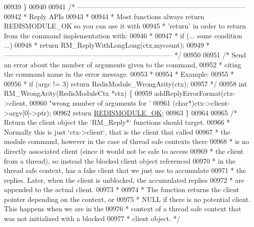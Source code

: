 \begin{DoxyCode}
{00939 \}
00940 
00941 \textcolor{comment}{/* --------------------------------------------------------------------------}
00942 \textcolor{comment}{ * Reply APIs}
00943 \textcolor{comment}{ *}
00944 \textcolor{comment}{ * Most functions always return REDISMODULE\_OK so you can use it with}
00945 \textcolor{comment}{ * 'return' in order to return from the command implementation with:}
00946 \textcolor{comment}{ *}
00947 \textcolor{comment}{ *     if (... some condition ...)}
00948 \textcolor{comment}{ *         return RM\_ReplyWithLongLong(ctx,mycount);}
00949 \textcolor{comment}{ * -------------------------------------------------------------------------- */}
00950 
00951 \textcolor{comment}{/* Send an error about the number of arguments given to the command,}
00952 \textcolor{comment}{ * citing the command name in the error message.}
00953 \textcolor{comment}{ *}
00954 \textcolor{comment}{ * Example:}
00955 \textcolor{comment}{ *}
00956 \textcolor{comment}{ *     if (argc != 3) return RedisModule\_WrongArity(ctx);}
00957 \textcolor{comment}{ */}
00958 \textcolor{keywordtype}{int} RM\_WrongArity(RedisModuleCtx *ctx) \{
00959     addReplyErrorFormat(ctx->client,
00960         \textcolor{stringliteral}{"wrong number of arguments for '%
00961         (\textcolor{keywordtype}{char}*)ctx->client->argv[0]->ptr);
00962     \textcolor{keywordflow}{return} \hyperlink{redismodule_8h_a1bc5bfd69abcd378ff52c640adc5418d}{REDISMODULE\_OK};
00963 \}
00964 
00965 \textcolor{comment}{/* Return the client object the `RM\_Reply*` functions should target.}
00966 \textcolor{comment}{ * Normally this is just `ctx->client`, that is the client that called}
00967 \textcolor{comment}{ * the module command, however in the case of thread safe contexts there}
00968 \textcolor{comment}{ * is no directly associated client (since it would not be safe to access}
00969 \textcolor{comment}{ * the client from a thread), so instead the blocked client object referenced}
00970 \textcolor{comment}{ * in the thread safe context, has a fake client that we just use to accumulate}
00971 \textcolor{comment}{ * the replies. Later, when the client is unblocked, the accumulated replies}
00972 \textcolor{comment}{ * are appended to the actual client.}
00973 \textcolor{comment}{ *}
00974 \textcolor{comment}{ * The function returns the client pointer depending on the context, or}
00975 \textcolor{comment}{ * NULL if there is no potential client. This happens when we are in the}
00976 \textcolor{comment}{ * context of a thread safe context that was not initialized with a blocked}
00977 \textcolor{comment}{ * client object. */}
}}
\end{DoxyCode}
